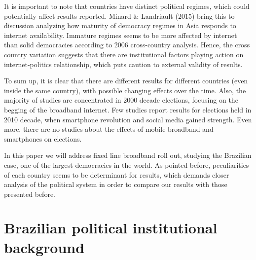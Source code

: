 \documentclass[
  12pt,
]{article}
\begin{document}
It is important to note that countries have distinct political regimes,
which could potentially affect results reported. Minard \& Landriault
(2015) bring this to discussion analyzing how maturity of democracy
regimes in Asia responds to internet availability. Immature regimes
seems to be more affected by internet than solid democracies according
to 2006 cross-country analysis. Hence, the cross country variation
suggests that there are institutional factors playing action on
internet-politics relationship, which puts caution to external validity
of results.

To sum up, it is clear that there are different results for different
countries (even inside the same country), with possible changing effects
over the time. Also, the majority of studies are concentrated in 2000
decade elections, focusing on the begging of the broadband internet. Few
studies report results for elections held in 2010 decade, when
smartphone revolution and social media gained strength. Even more, there
are no studies about the effects of mobile broadband and smartphones on
elections.

In this paper we will address fixed line broadband roll out, studying
the Brazilian case, one of the largest democracies in the world. As
pointed before, peculiarities of each country seems to be determinant
for results, which demands closer analysis of the political system in
order to compare our results with those presented before.

\hypertarget{brazilian-political-institutional-background}{%
\section{Brazilian political institutional
background}\label{brazilian-political-institutional-background}}
\end{document}
